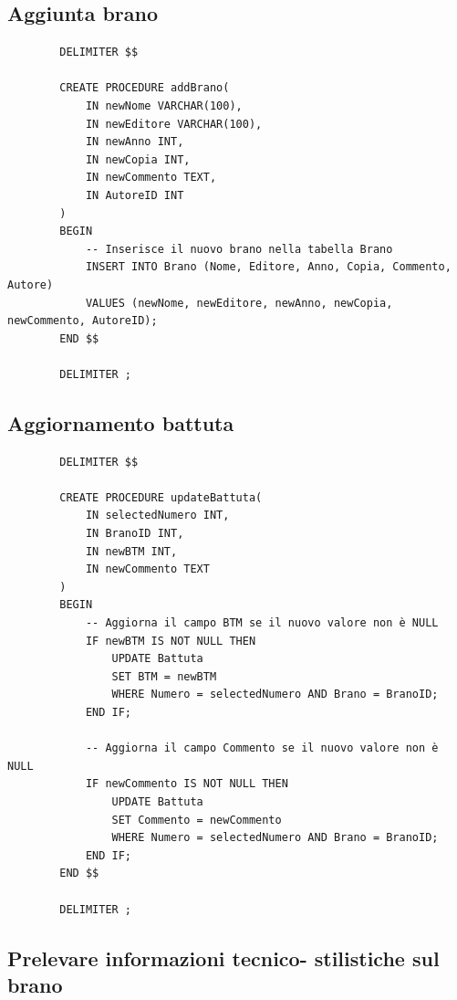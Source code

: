 \documentclass{article}
\begin{document}
    \subsection{Aggiunta brano}
    
    \begin{verbatim}
        DELIMITER $$

        CREATE PROCEDURE addBrano(
            IN newNome VARCHAR(100),
            IN newEditore VARCHAR(100),
            IN newAnno INT,
            IN newCopia INT,
            IN newCommento TEXT,
            IN AutoreID INT
        )
        BEGIN
            -- Inserisce il nuovo brano nella tabella Brano
            INSERT INTO Brano (Nome, Editore, Anno, Copia, Commento, Autore)
            VALUES (newNome, newEditore, newAnno, newCopia, newCommento, AutoreID);
        END $$

        DELIMITER ;
    \end{verbatim}
    
    \subsection{Aggiornamento battuta}
    
    \begin{verbatim}
        DELIMITER $$

        CREATE PROCEDURE updateBattuta(
            IN selectedNumero INT,
            IN BranoID INT,
            IN newBTM INT,
            IN newCommento TEXT
        )
        BEGIN
            -- Aggiorna il campo BTM se il nuovo valore non è NULL
            IF newBTM IS NOT NULL THEN
                UPDATE Battuta
                SET BTM = newBTM
                WHERE Numero = selectedNumero AND Brano = BranoID;
            END IF;

            -- Aggiorna il campo Commento se il nuovo valore non è NULL
            IF newCommento IS NOT NULL THEN
                UPDATE Battuta
                SET Commento = newCommento
                WHERE Numero = selectedNumero AND Brano = BranoID;
            END IF;
        END $$

        DELIMITER ;
    \end{verbatim}
    
    \subsection{Prelevare informazioni tecnico-
    stilistiche sul brano}
    
\end{document}
